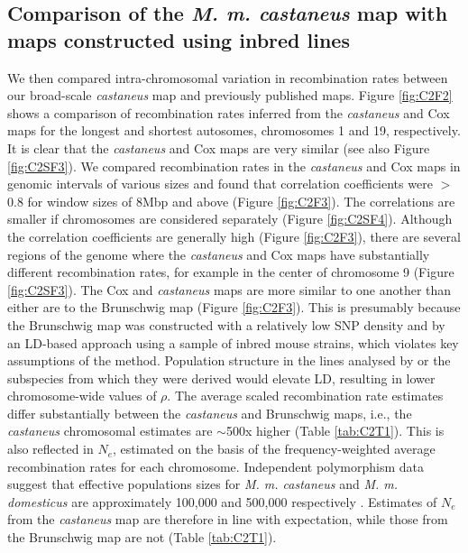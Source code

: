 \linespread{1}

\linespread{2}

\subsection{Comparison of the \textit{M. m. castaneus} map with maps constructed using inbred lines}
 
        	We then compared intra-chromosomal variation in recombination rates between our broad-scale \textit{castaneus} map and previously published maps. Figure \ref{fig:C2F2} shows a comparison of recombination rates inferred from the \textit{castaneus} and Cox maps for the longest and shortest autosomes, chromosomes 1 and 19, respectively. It is clear that the \textit{castaneus} and Cox maps are very similar (see also Figure \ref{fig:C2SF3}). We compared recombination rates in the \textit{castaneus} and Cox maps in genomic intervals of various sizes and found that correlation coefficients were $>$0.8 for window sizes of 8Mbp and above (Figure \ref{fig:C2F3}). The correlations are smaller if chromosomes are considered separately (Figure \ref{fig:C2SF4}). Although the correlation coefficients are generally high (Figure \ref{fig:C2F3}), there are several regions of the genome where the \textit{castaneus} and Cox maps have substantially different recombination rates, for example in the center of chromosome 9 (Figure \ref{fig:C2SF3}). The Cox and \textit{castaneus} maps are more similar to one another than either are to the Brunschwig map (Figure \ref{fig:C2F3}). This is presumably because the Brunschwig map was constructed with a relatively low SNP density and by an LD-based approach using a sample of inbred mouse strains, which violates key assumptions of the method. Population structure in the lines analysed by \cite{RN156} or the subspecies from which they were derived would elevate LD, resulting in lower chromosome-wide values of $\rho$. The average scaled recombination rate estimates differ substantially between the \textit{castaneus} and Brunschwig maps, i.e., the \textit{castaneus} chromosomal estimates are $\sim$500x higher (Table \ref{tab:C2T1}). This is also reflected in $N_e$, estimated on the basis of the frequency-weighted average recombination rates for each chromosome. Independent polymorphism data suggest that effective populations sizes for \textit{M. m. castaneus} and \textit{M. m. domesticus} are approximately 100,000 and 500,000 respectively \citep{RN255,RN315}. Estimates of $N_e$ from the \textit{castaneus} map are therefore in line with expectation, while those from the Brunschwig map are not (Table \ref{tab:C2T1}).


